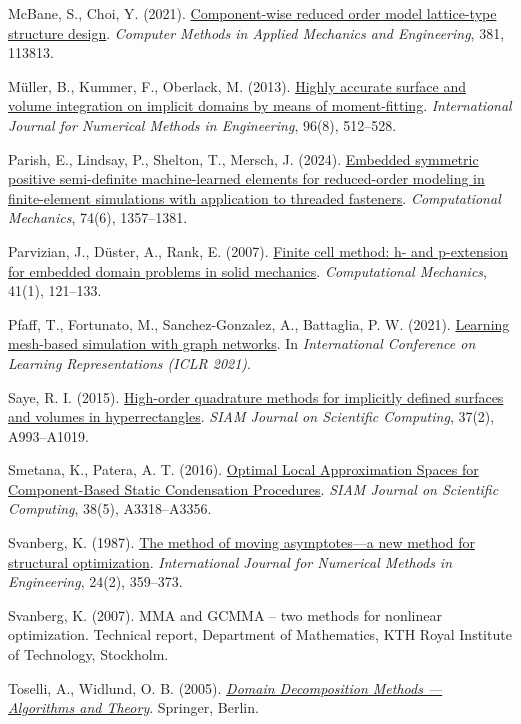\documentclass[preprint,12pt,authoryear]{elsarticle}
\begin{document}
McBane, S., Choi, Y. (2021). \href{https://doi.org/10.1016/j.cma.2021.113813}{Component-wise reduced order model lattice-type structure design}. \emph{Computer Methods in Applied Mechanics and Engineering}, 381, 113813.

Müller, B., Kummer, F., Oberlack, M. (2013). \href{https://doi.org/10.1002/nme.4569}{Highly accurate surface and volume integration on implicit domains by means of moment-fitting}. \emph{International Journal for Numerical Methods in Engineering}, 96(8), 512--528.

Parish, E., Lindsay, P., Shelton, T., Mersch, J. (2024). \href{https://doi.org/10.1007/s00466-024-02481-5}{Embedded symmetric positive semi-definite machine-learned elements for reduced-order modeling in finite-element simulations with application to threaded fasteners}. \emph{Computational Mechanics}, 74(6), 1357--1381.

Parvizian, J., Düster, A., Rank, E. (2007). \href{https://doi.org/10.1007/s00466-007-0173-y}{Finite cell method: h- and p-extension for embedded domain problems in solid mechanics}. \emph{Computational Mechanics}, 41(1), 121--133.

Pfaff, T., Fortunato, M., Sanchez-Gonzalez, A., Battaglia, P. W. (2021). \href{https://openreview.net/forum?id=roNqYL0_XP}{Learning mesh-based simulation with graph networks}. In \emph{International Conference on Learning Representations (ICLR 2021)}.

Saye, R. I. (2015). \href{https://doi.org/10.1137/140966290}{High-order quadrature methods for implicitly defined surfaces and volumes in hyperrectangles}. \emph{SIAM Journal on Scientific Computing}, 37(2), A993--A1019.

Smetana, K., Patera, A. T. (2016). \href{https://doi.org/10.1137/15m1009603}{Optimal Local Approximation Spaces for Component-Based Static Condensation Procedures}. \emph{SIAM Journal on Scientific Computing}, 38(5), A3318--A3356.

Svanberg, K. (1987). \href{https://doi.org/10.1002/nme.1620240207}{The method of moving asymptotes---a new method for structural optimization}. \emph{International Journal for Numerical Methods in Engineering}, 24(2), 359--373.

Svanberg, K. (2007). MMA and GCMMA -- two methods for nonlinear optimization. Technical report, Department of Mathematics, KTH Royal Institute of Technology, Stockholm.

Toselli, A., Widlund, O. B. (2005). \href{https://doi.org/10.1007/b137868}{\emph{Domain Decomposition Methods --- Algorithms and Theory}}. Springer, Berlin.
\end{document}
